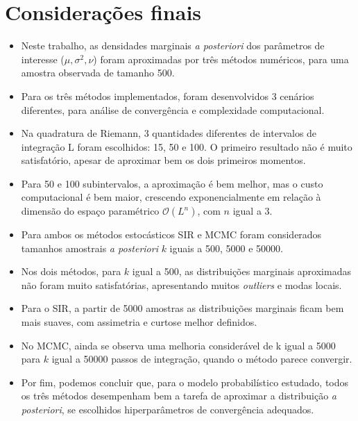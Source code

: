 \documentclass[9pt]{beamer}
\begin{document}
\section{Considerações finais}
\begin{frame}
\begin{itemize}
\justifying	
\item Neste trabalho, as densidades marginais \textit{a posteriori} dos parâmetros de interesse ($\mu, \sigma^2, \nu$) foram aproximadas por três métodos numéricos, para uma amostra observada de tamanho 500.
\item Para os três métodos implementados, foram desenvolvidos 3 cenários diferentes, para análise de convergência e complexidade computacional.
\item Na quadratura de Riemann, 3 quantidades diferentes de intervalos de integração L foram escolhidos: 15, 50 e 100. O primeiro resultado não é muito satisfatório, apesar de aproximar bem os dois primeiros momentos.	
\item Para 50 e 100 subintervalos, a aproximação é bem melhor, mas o custo computacional é bem maior, crescendo exponencialmente em relação à dimensão do espaço paramétrico $\mathcal{O}(L^n)$, com $n$ igual a 3.
\end{itemize}	
\end{frame}
\begin{frame}
\begin{itemize}
\justifying	
\item Para ambos os métodos estocásticos SIR e MCMC foram considerados tamanhos amostrais \textit{a posteriori} $k$ iguais a 500, 5000 e 50000.

\item Nos dois métodos, para $k$ igual a 500, as distribuições marginais aproximadas não foram muito satisfatórias, apresentando muitos \textit{outliers} e modas locais.

\item Para o SIR, a partir de 5000 amostras as distribuições marginais ficam bem mais suaves, com assimetria e curtose melhor definidos.

\item No MCMC, ainda se observa uma melhoria considerável de k
igual a 5000 para $k$ igual a 50000 passos de integração, quando o método parece convergir.

\item Por fim, podemos concluir que, para o modelo probabilístico estudado, todos os três métodos desempenham bem a tarefa de aproximar a distribuição \textit{a posteriori}, se escolhidos hiperparâmetros de convergência adequados.
\end{itemize}	
\end{frame}
\end{document}
